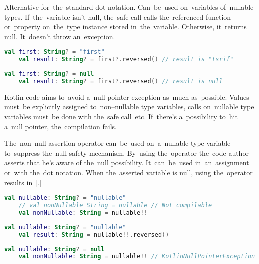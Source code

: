 \label{kotlinsafecall}
Alternative for~the~standard dot notation.
Can~be~used on~variables of~nullable types.
If~the~variable isn't null, the~safe call calls the~referenced function or~property on~the~type instance stored in~the~variable.
Otherwise, it~returns null.
It~doesn't throw an~exception.

\begin{lstlisting}[language=Kotlin]
    val first: String? = "first"
    val result: String? = first?.reversed() // result is "tsrif"
\end{lstlisting}

\begin{lstlisting}[language=Kotlin]
    val first: String? = null
    val result: String? = first?.reversed() // result is null
\end{lstlisting}

Kotlin code aims to~avoid a~null pointer exception as~much as~possible.
Values must~be explicitly assigned to~non--nullable type variables, calls on~nullable type variables must~be done with the~\hyperref[kotlinsafecall]{safe call}~etc.
If~there's a~possibility to~hit a~null pointer, the~compilation fails.

\mbox{The~non--null} assertion operator can~be~used on~a~nullable type variable to~suppress the~null safety mechanism.
By~using the~operator the~code author asserts that he's aware of the~null possibility.
It~can~be~used in~an~assignment or~with the~dot notation.
When the~asserted variable is null, using the~operator results in~[.]

\begin{lstlisting}[language=Kotlin]
    val nullable: String? = "nullable"
    // val nonNullable String = nullable // Not compilable
    val nonNullable: String = nullable!!
\end{lstlisting}

\begin{lstlisting}[language=Kotlin]
    val nullable: String? = "nullable"
    val result: String = nullable!!.reversed()
\end{lstlisting}

\begin{lstlisting}[language=Kotlin]
    val nullable: String? = null
    val nonNullable: String = nullable!! // KotlinNullPointerException
\end{lstlisting}

